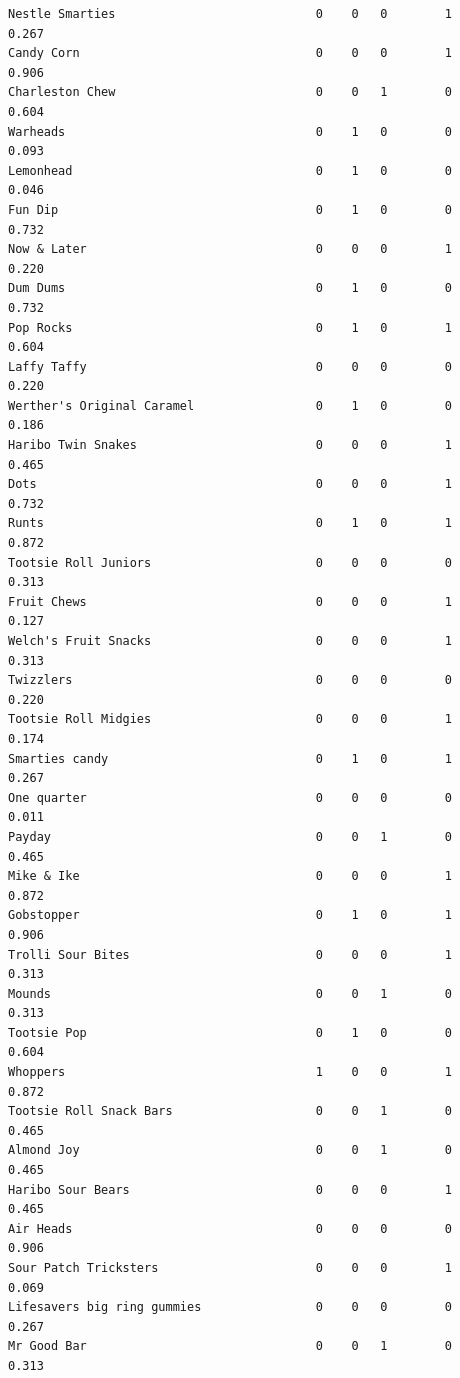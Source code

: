 \documentclass[
  letterpaper,
  DIV=11,
  numbers=noendperiod]{scrartcl}
\begin{document}
\begin{verbatim}
Nestle Smarties                            0    0   0        1        0.267
Candy Corn                                 0    0   0        1        0.906
Charleston Chew                            0    0   1        0        0.604
Warheads                                   0    1   0        0        0.093
Lemonhead                                  0    1   0        0        0.046
Fun Dip                                    0    1   0        0        0.732
Now & Later                                0    0   0        1        0.220
Dum Dums                                   0    1   0        0        0.732
Pop Rocks                                  0    1   0        1        0.604
Laffy Taffy                                0    0   0        0        0.220
Werther's Original Caramel                 0    1   0        0        0.186
Haribo Twin Snakes                         0    0   0        1        0.465
Dots                                       0    0   0        1        0.732
Runts                                      0    1   0        1        0.872
Tootsie Roll Juniors                       0    0   0        0        0.313
Fruit Chews                                0    0   0        1        0.127
Welch's Fruit Snacks                       0    0   0        1        0.313
Twizzlers                                  0    0   0        0        0.220
Tootsie Roll Midgies                       0    0   0        1        0.174
Smarties candy                             0    1   0        1        0.267
One quarter                                0    0   0        0        0.011
Payday                                     0    0   1        0        0.465
Mike & Ike                                 0    0   0        1        0.872
Gobstopper                                 0    1   0        1        0.906
Trolli Sour Bites                          0    0   0        1        0.313
Mounds                                     0    0   1        0        0.313
Tootsie Pop                                0    1   0        0        0.604
Whoppers                                   1    0   0        1        0.872
Tootsie Roll Snack Bars                    0    0   1        0        0.465
Almond Joy                                 0    0   1        0        0.465
Haribo Sour Bears                          0    0   0        1        0.465
Air Heads                                  0    0   0        0        0.906
Sour Patch Tricksters                      0    0   0        1        0.069
Lifesavers big ring gummies                0    0   0        0        0.267
Mr Good Bar                                0    0   1        0        0.313

\end{verbatim}
\end{document}
